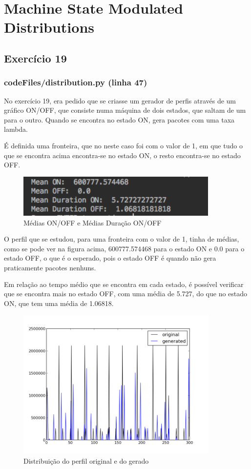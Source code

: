 \documentclass[pdftex,12pt,a4paper]{report}
\begin{document}
\newpage

\section{Machine State Modulated Distributions}
\subsection{Exercício 19}
\subsubsection{codeFiles/distribution.py (linha 47)}


No exercício 19, era pedido que se criasse um gerador de perfis através de um gráfico ON/OFF, que consiste numa máquina de dois estados, que saltam de um para o outro. Quando se encontra no estado ON, gera pacotes com uma taxa lambda. 

É definida uma fronteira, que no neste caso foi com o valor de 1, em que tudo o que se encontra acima encontra-se no estado ON, o resto encontra-se no estado OFF.

\begin{figure}[!htb]
\center
 \includegraphics[width=100mm,scale=1]{distribution/ex19Terminal.png}
 \caption{Médias ON/OFF e Médias Duração ON/OFF}
 \label{fig:ex19Terminal}
\end{figure}

O perfil que se estudou, para uma fronteira com o valor de 1, tinha de médias, como se pode ver na figura acima, 600777.574468 para o estado ON e 0.0 para o estado OFF, o que é o esperado, pois o estado OFF é quando não gera praticamente pacotes nenhuns.

Em relação ao tempo médio que se encontra em cada estado, é possível verificar que se encontra mais no estado OFF, com uma média de 5.727, do que no estado ON, que tem uma média de 1.06818.

\begin{figure}[!htb]
\center
 \includegraphics[width=100mm,scale=1]{distribution/ex19.png}
 \caption{Distribuição do perfil original e do gerado}
 \label{fig:ex19}
\end{figure}
\end{document}
